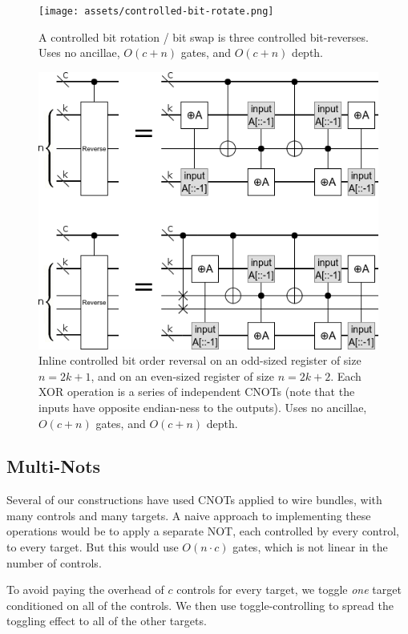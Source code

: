 \documentclass[twocolumn,longbibliography]{quantumarticle-customized}
\begin{document}
\begin{figure}
  \centering
  \texttt{[image: assets/controlled-bit-rotate.png]}
  \caption{
    A controlled bit rotation / bit swap is three controlled bit-reverses.
    Uses no ancillae, $O(c + n)$ gates, and $O(c + n)$ depth.
  }
  \label{fig:bit-rotate}
\end{figure}

\begin{figure}
  \centering
  \includegraphics[width=\linewidth]{assets/controlled-reverse.png}
  \caption{
    Inline controlled bit order reversal on an odd-sized register of size $n=2k+1$, and on an even-sized register of size $n=2k+2$.
    Each XOR operation is a series of independent CNOTs (note that the inputs have opposite endian-ness to the outputs).
    Uses no ancillae, $O(c + n)$ gates, and $O(c + n)$ depth.
  }
  \label{fig:bit-reverse}
\end{figure}


\subsection{Multi-Nots}

Several of our constructions have used CNOTs applied to wire bundles, with many controls and many targets.
A naive approach to implementing these operations would be to apply a separate NOT, each controlled by every control, to every target.
But this would use $O(n \cdot c)$ gates, which is not linear in the number of controls.

To avoid paying the overhead of $c$ controls for every target, we toggle {\em one} target conditioned on all of the controls.
We then use toggle-controlling to spread the toggling effect to all of the other targets.
\end{document}
